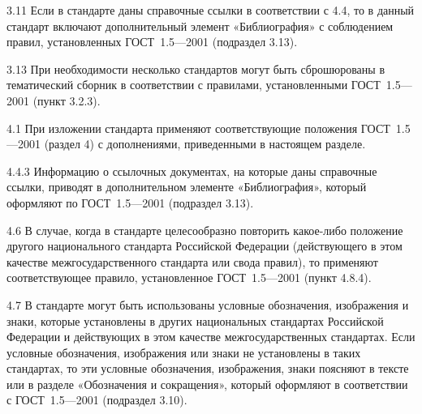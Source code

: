 \documentclass[12pt, twoside, final]{ruost}
\begin{document}
\begin{OST}
					\begin{stdquote}
						\par 3.11 Если в стандарте даны справочные ссылки в соответствии с 4.4, то в данный стандарт включают дополнительный элемент «Библиография» с соблюдением правил, установленных ГОСТ~1.5—2001 (подраздел 3.13).
						\par [ГОСТ Р 1.5---2012]
					\end{stdquote}
					
					\begin{stdquote}
						\par 3.13 При необходимости несколько стандартов могут быть сброшюрованы в тематический сборник в соответствии с правилами, установленными ГОСТ~1.5—2001 (пункт 3.2.3).
						\par [ГОСТ Р 1.5---2012]
					\end{stdquote}
					
					\begin{stdquote}
						\par 4.1 При изложении стандарта применяют соответствующие положения ГОСТ~1.5—2001 (раздел 4) с дополнениями, приведенными в настоящем разделе.
						\par [ГОСТ Р 1.5---2012]
					\end{stdquote}
					
					\begin{stdquote}
						\par 4.4.3 Информацию о ссылочных документах, на которые даны справочные ссылки, приводят в дополнительном элементе «Библиография», который оформляют по ГОСТ~1.5—2001 (подраздел 3.13).
						\par [ГОСТ Р 1.5---2012]
					\end{stdquote}
					
					\begin{stdquote}
						\par 4.6 В случае, когда в стандарте целесообразно повторить какое-либо положение другого национального стандарта Российской Федерации (действующего в этом качестве межгосударственного стандарта или свода правил), то применяют соответствующее правило, установленное ГОСТ~1.5—2001 (пункт 4.8.4).
						\par [ГОСТ Р 1.5---2012]
					\end{stdquote}
					
					\begin{stdquote}
						\par 4.7 В стандарте могут быть использованы условные обозначения, изображения и знаки, которые установлены в других национальных стандартах Российской Федерации и действующих в этом качестве межгосударственных стандартах. Если условные обозначения, изображения или знаки не установлены в таких стандартах, то эти условные обозначения, изображения, знаки поясняют в тексте или в разделе «Обозначения и сокращения», который оформляют в соответствии с ГОСТ~1.5—2001 (подраздел 3.10).
						\par [ГОСТ Р 1.5---2012]
					\end{stdquote}
					

\end{OST}
\end{document}
